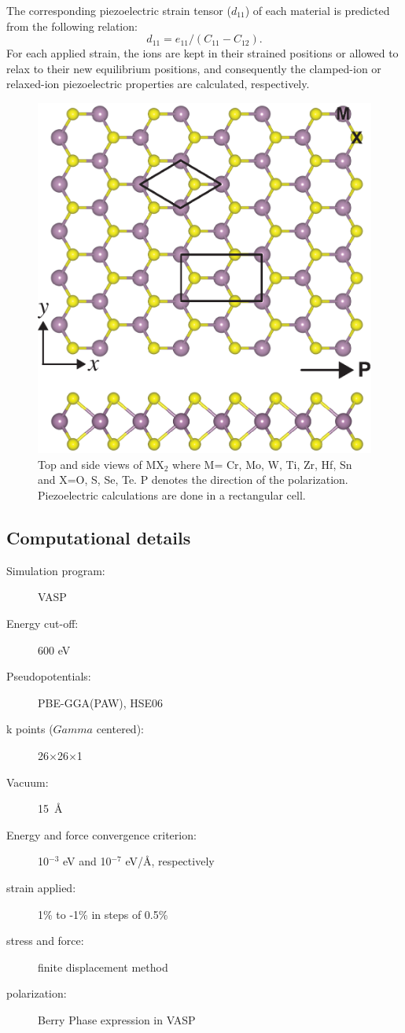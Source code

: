 The corresponding piezoelectric strain tensor ($d_{11}$) of each material is predicted from the following relation\cite{Duerloo2012}:
\begin{equation}\label{eq:d11}
                d_{11}= e_{11}/( C_{11} - C_{12} ).
\end{equation}
For each applied strain, the ions are kept in their strained positions or allowed to relax to their new equilibrium positions, and consequently the clamped-ion or relaxed-ion piezoelectric properties are calculated, respectively.

\begin{figure}[htbp]
\centering
	\includegraphics[width=0.5\linewidth]{mx2_str.eps}
	\caption{Top and side views of MX$_2$ where M= Cr,  Mo, W, Ti, Zr, Hf, Sn and X=O, S, Se, Te. P denotes the direction of the polarization. Piezoelectric calculations are done in a rectangular cell. \label{fig:mx2_str}}
\end{figure}

\subsection{Computational details}
\begin{footnotesize}
\begin{description}
\item[Simulation program:] VASP
\item[Energy cut-off:] 600 eV
\item[Pseudopotentials:] PBE-GGA(PAW), HSE06
\item[k points ($Gamma$ centered):] 26$\times$26$\times$1
\item[Vacuum:] 15~\AA
\item[Energy and force convergence criterion:] 10$^{-3}$ eV and 10$^{-7}$ eV/\AA, respectively
\item[strain applied:] 1\% to -1\% in steps of 0.5\%
\item[stress and force:] finite displacement method
\item[polarization:] Berry Phase expression \cite{vanderbilt2000} in VASP
\end{description}
\end{footnotesize}

